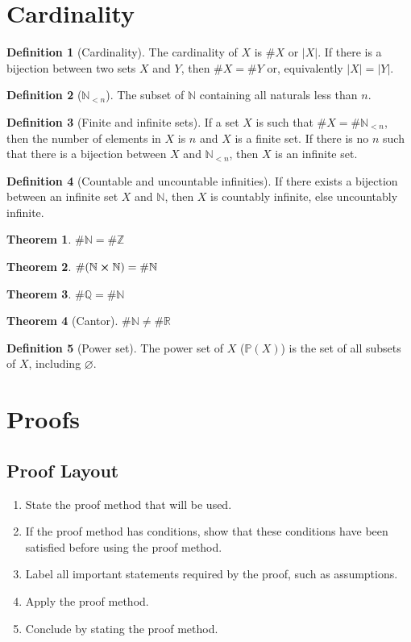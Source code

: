 \documentclass{article}
\let\emptyset\varnothing
\theoremstyle{plain}
\newtheorem{theorem}{Theorem}[section]
\numberwithin{theorem}{section}
\theoremstyle{definition}
\newtheorem{definition}{Definition}[section]
\numberwithin{definition}{section}
\newcommand*{\N}{\mathbb{N}}
\newcommand*{\Z}{\mathbb{Z}}
\newcommand*{\Q}{\mathbb{Q}}
\newcommand*{\R}{\mathbb{R}}
\begin{document}
\section{Cardinality}
\begin{definition}[Cardinality]
    The cardinality of $X$ is $\#X$ or $|X|$.
    If there is a bijection between two sets $X$ and $Y$,
    then $\#X=\#Y$ or, equivalently $|X| = |Y|$.
\end{definition}
%
\begin{definition}[$\N_{<n}$]
    The subset of $\N$ containing all naturals less than $n$.
\end{definition}
%
\begin{definition}[Finite and infinite sets]
    If a set $X$ is such that $\#X=\#\N_{<n}$,
    then the number of elements in $X$ is $n$ and $X$ is a finite set.
    If there is no $n$ such that there is a bijection between $X$ and $\N_{<n}$,
    then $X$ is an infinite set.
\end{definition}
%
\begin{definition}[Countable and uncountable infinities]
    If there exists a bijection between an infinite set $X$ and $\N$,
    then $X$ is countably infinite, else uncountably infinite.
\end{definition}
%
\begin{theorem}$\#\N = \#\Z$\end{theorem}
\begin{theorem}$\#(\N\cross\N) = \#\N$\end{theorem}
\begin{theorem}$\#\Q = \#\N$\end{theorem}
\begin{theorem}[Cantor]$\#\N \ne \#\R$\end{theorem}
%
\begin{definition}[Power set]
    The power set of $X$ ($\mathbb{P}(X)$) is the set of all subsets of $X$, including $\emptyset$.
\end{definition}
%
\section{Proofs}
\subsection{Proof Layout}
\begin{enumerate}
    \item State the proof method that will be used.
    \item If the proof method has conditions, show that these conditions have been satisfied before using the proof method.
    \item Label all important statements required by the proof, such as assumptions.
    \item Apply the proof method.
    \item Conclude by stating the proof method.
\end{enumerate}
%
\end{document}
